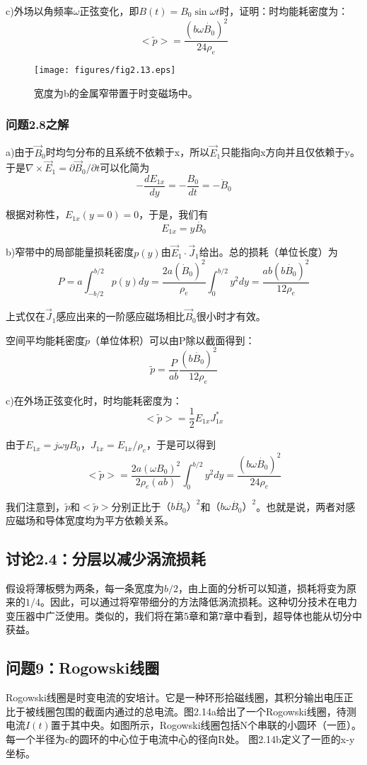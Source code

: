c)外场以角频率$\omega$正弦变化，即$B(t)=B_0 \sin\omega t$时，证明：时均能耗密度为：
$$<\tilde{p}>=\frac{(b\omega\dot{B_0})^2}{24\rho_e}$$

\begin{figure}
  \centering
 \texttt{[image: figures/fig2.13.eps]}
  \caption{宽度为b的金属窄带置于时变磁场中。}
\end{figure}

\subsubsection{问题2.8之解}
a)由于$\vec{B}_0$时均匀分布的且系统不依赖于x，所以$\vec{E}_1$只能指向x方向并且仅依赖于y。于是$\nabla\times \vec{E}_1=\partial \vec{B}_0/\partial t$可以化简为
$$-\frac{dE_{1x}}{dy}=-\frac{B_0}{dt}=-\dot{B}_0$$

根据对称性，$E_{1x}(y=0)=0$，于是，我们有
$$E_{1x}=y\dot{B_0}$$

b)窄带中的局部能量损耗密度$p(y)$由$\vec{E}_1\cdot\vec{J}_1$给出。总的损耗（单位长度）为
$$P=a\int_{-b/2}^{b/2}p(y)dy=\frac{2a(\dot{B}_0)^2}{\rho_e}\int_{0}^{b/2}y^2dy=\frac{ab(b\dot{B_0})^2}{12\rho_e}$$

上式仅在$\vec{J}_1$感应出来的一阶感应磁场相比$\vec{B}_0$很小时才有效。

空间平均能耗密度$\tilde{p}$（单位体积）可以由P除以截面得到：
$$\tilde{p}=\frac{P}{ab}\frac{(b\dot{B_0})^2}{12\rho_e}$$

c)在外场正弦变化时，时均能耗密度为：
$$<\tilde{p}>=\frac{1}{2}E_{1x} J_{1x}^*$$

由于$E_{1x}=j\omega y B_0$，$J_{1x}=E_{1x}/\rho_e$，于是可以得到
$$<\tilde{p}>=\frac{2a(\omega B_0)^2}{2\rho_e (ab)}\int_{0}^{b/2} y^2 dy=\frac{(b\omega\dot{B_0})^2}{24\rho_e}$$

我们注意到，$\tilde{p}$和$<\tilde{p}>$分别正比于$（b\dot{B_0}）^2$和$（b\omega \dot{B_0}）^2$。也就是说，两者对感应磁场和导体宽度均为平方依赖关系。

\subsection{讨论2.4：分层以减少涡流损耗}
假设将薄板劈为两条，每一条宽度为$b/2$，由上面的分析可以知道，损耗将变为原来的$1/4$。因此，可以通过将窄带细分的方法降低涡流损耗。这种切分技术在电力变压器中广泛使用。类似的，我们将在第5章和第7章中看到，超导体也能从切分中获益。


\subsection{问题9：Rogowski线圈}
Rogowski线圈是时变电流的安培计。它是一种环形拾磁线圈，其积分输出电压正比于被线圈包围的截面内通过的总电流。图2.14a给出了一个Rogowski线圈，待测电流$I(t)$置于其中央。如图所示，Rogowski线圈包括N个串联的小圆环（一匝）。每一个半径为c的圆环的中心位于电流中心的径向R处。
图2.14b定义了一匝的x-y坐标。

